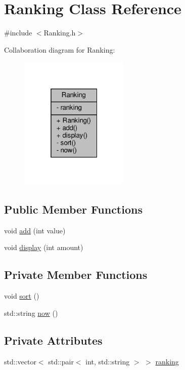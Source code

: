 \hypertarget{classRanking}{}\section{Ranking Class Reference}
\label{classRanking}


{\ttfamily \#include $<$Ranking.\+h$>$}



Collaboration diagram for Ranking\+:
\nopagebreak
\begin{figure}[H]
\begin{center}
\leavevmode
\includegraphics[width=148pt]{classRanking__coll__graph}
\end{center}
\end{figure}
\subsection*{Public Member Functions}
\begin{DoxyCompactItemize}
\item 
void \hyperlink{classRanking_a4969110ba50a492be5d125c9b1710cf0}{add} (int value)
\item 
void \hyperlink{classRanking_ade50abc368e58d4c7879e437f819e982}{display} (int amount)
\end{DoxyCompactItemize}
\subsection*{Private Member Functions}
\begin{DoxyCompactItemize}
\item 
void \hyperlink{classRanking_aa77c088257f2ac17f165147283136016}{sort} ()
\item 
std\+::string \hyperlink{classRanking_aa3ed270c7a8a059568c3af87fd73bd03}{now} ()
\end{DoxyCompactItemize}
\subsection*{Private Attributes}
\begin{DoxyCompactItemize}
\item 
std\+::vector$<$ std\+::pair$<$ int, std\+::string $>$ $>$ \hyperlink{classRanking_aead444bd691bbfa450ccdec64012ab86}{ranking}
\end{DoxyCompactItemize}



